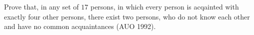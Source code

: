 Prove that, in any set of $17$ persons, in which every person is acqainted with exactly four other persons, there exist two persons, who do not know each other and have no common acquaintances (AUO 1992).
